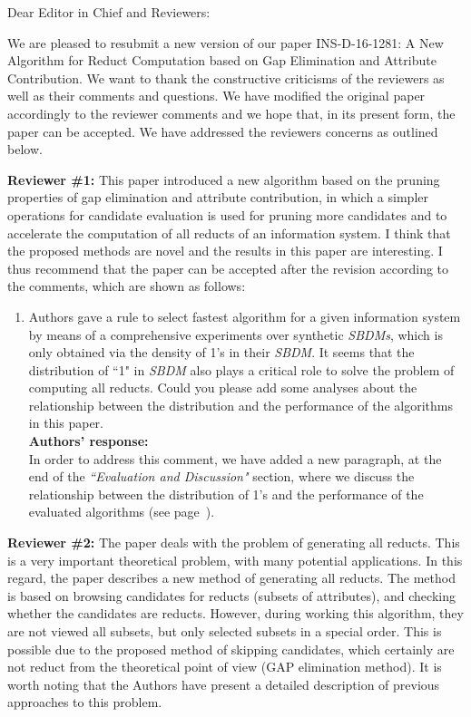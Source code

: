 \documentclass{letter}
\begin{document}
\begin{letter}{}
  \opening{Dear Editor in Chief and Reviewers:}

  We are pleased to resubmit a new version of our paper INS-D-16-1281: A New Algorithm for Reduct Computation based on Gap Elimination and Attribute Contribution. We want to thank the constructive criticisms of the reviewers as well as their comments and questions. We have modified the original paper accordingly to the reviewer comments and we hope that, in its present form, the paper can be accepted. We have addressed the reviewers concerns as outlined below.

  \textbf{Reviewer \#1:} 
  This paper introduced a new algorithm based on the pruning properties of gap elimination and attribute contribution, in which a simpler operations for candidate evaluation is used for pruning more candidates and to accelerate the computation of all reducts of an information system. I think that the proposed methods are novel and the results in this paper are interesting. I thus recommend that the paper can be accepted after the revision according to the comments, which are shown as follows:

  \begin{enumerate}
    \item Authors gave a rule to select fastest algorithm for a given information system by means of a comprehensive experiments over synthetic \textit{SBDMs}, which is only obtained via the density of 1's in their \textit{SBDM}. It seems that the distribution of ``1" in \textit{SBDM} also plays a critical role to solve the problem of computing all reducts. Could you please add some analyses about the relationship between the distribution and the performance of the algorithms in this paper.\\
    \textbf{Authors’ response:} \\
    In order to address this comment, we have added a new paragraph, at the end of the \textit{``Evaluation and Discussion"} section, where we discuss the relationship between the distribution of 1's and the performance of the evaluated algorithms (see page~\pageref{par:distribution}).
  \end{enumerate}
  
  \textbf{Reviewer \#2:}
  The paper deals with the problem of generating all reducts. This is a very important theoretical problem, with many potential applications. In this regard, the paper describes a new method of generating all reducts. The method is based on browsing candidates for reducts (subsets of attributes), and checking whether the candidates are reducts. However, during working this algorithm, they are not viewed all subsets, but only selected subsets in a special order. This is possible due to the proposed method of skipping candidates, which certainly are not reduct from the theoretical point of view (GAP elimination method).
  It is worth noting that the Authors have present a detailed description of previous approaches to this problem.
  

\end{letter}
\end{document}
